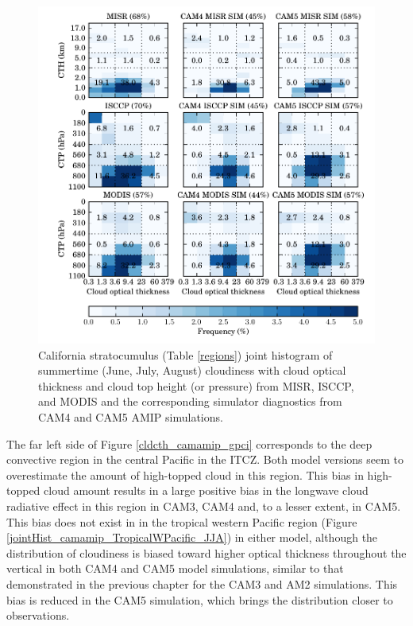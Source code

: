 \begin{figure}
    \centering
    \includegraphics{../graphics/hist2d_camamip_california.pdf}
    \caption[California stratocumulus joint histogram of summertime cloudiness with cloud optical thickness and cloud top height from MISR, ISCCP, and MODIS and the corresponding simulator diagnostics from CAM4 and CAM5 AMIP simulations.]{California stratocumulus (Table \ref{regions}) joint histogram of summertime (June, July, August) cloudiness with cloud optical thickness and cloud top height (or pressure) from MISR, ISCCP, and MODIS and the corresponding simulator diagnostics from CAM4 and CAM5 AMIP simulations.}
    \label{jointHist_camamip_CaliforniaStrat_JJA}
\end{figure}

The far left side of Figure \ref{cldcth_camamip_gpci} corresponds to the deep convective region in the central Pacific in the ITCZ. Both model versions seem to overestimate the amount of high-topped cloud in this region. This bias in high-topped cloud amount results in a large positive bias in the longwave cloud radiative effect in this region in CAM3, CAM4 and, to a lesser extent, in CAM5. This bias does not exist in in the tropical western Pacific region (Figure \ref{jointHist_camamip_TropicalWPacific_JJA}) in either model, although the distribution of cloudiness is biased toward higher optical thickness throughout the vertical in both CAM4 and CAM5 model simulations, similar to that demonstrated in the previous chapter for the CAM3 and AM2 simulations. This bias is reduced in the CAM5 simulation, which brings the distribution closer to observations.

